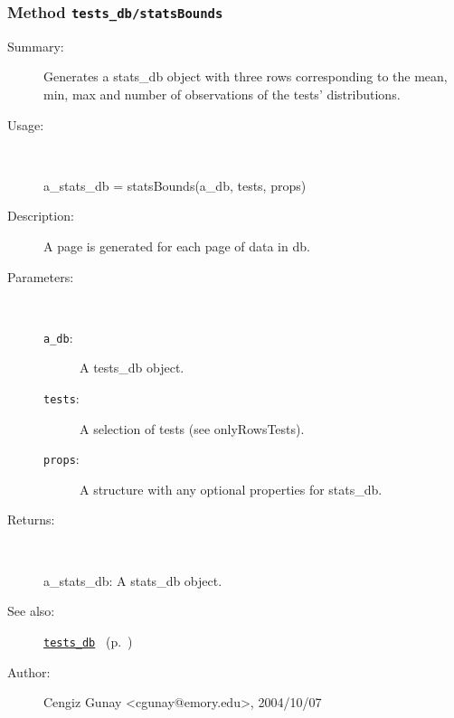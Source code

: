\subsubsection[Method \texttt{statsBounds}]{Method \texttt{tests\_db/statsBounds}}%
%
\label{ref_tests_db__statsBounds}%
\hypertarget{ref_tests_db__statsBounds}{}%
\begin{description}
\item[Summary:]Generates a stats\_db object with three rows corresponding to the mean, min, max and number of observations of the tests' distributions. 
%
\item[Usage:]~%
\begin{lyxcode}%
a\_stats\_db = statsBounds(a\_db, tests, props)
%
\end{lyxcode}%
%
\item[Description:]%
A page is generated for each page of data in db.
\item[Parameters:]~
\begin{description}%
\item[\texttt{a\_db}:]
 A tests\_db object.
\item[\texttt{tests}:]
 A selection of tests (see onlyRowsTests).
\item[\texttt{props}:]
 A structure with any optional properties for stats\_db.
\end{description}%
%
\item[Returns:
]~

	a\_stats\_db: A stats\_db object.
%
%
\item[See also:]%
\hyperlink{ref_tests_db}{\texttt{tests\_db}}%
\ (p.~\pageref{ref_tests_db})%
%
%
\item[Author:]%
Cengiz Gunay <cgunay@emory.edu>, 2004/10/07
%
\end{description}
\methodline%
